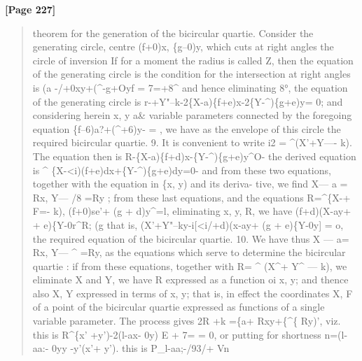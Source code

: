 \documentclass[11pt,a4paper]{book}
\begin{document}
\textbf{[Page 227]}\\[0.2cm]
\begin{quote}
theorem for the generation of the bicircular quartie. Consider the generating circle,
centre (f+0)x, \{g--0)y, which cuts at right angles the circle of inversion
If for a moment the radius is called Z, then the equation of the generating circle is
the condition for the intersection at right angles is
(a -/+0xy+(\textasciicircum{}-g+Oyf = 7=+8\textasciicircum{}
and hence eliminating 8°, the equation of the generating circle is
r-+Y"--k-2\{X-a)\{f+e)x-2\{Y-\textasciicircum{})\{g+e)y=
0;
and considering herein x, y a\& variable parameters connected by the foregoing equation
\{f--6)a?+(\textasciicircum{}+6)y- = , we have as the envelope of this circle the required bicircular
quartie.
9. It is convenient to write i2 = \textasciicircum{}(X'+Y---- k). The equation then is
R-\{X-a)\{f+d)x-\{Y-\textasciicircum{})\{g+e)y\textasciicircum{}O-
the derived equation is \textasciicircum{}
\{X-<i)(f+e)dx+\{Y-\textasciicircum{})\{g+e)dy=0-
and from these two equations, together with the equation in \{x, y) and its deriva-
tive, we find X--- a = Rx, Y--- /8 =Ry ; from these last equations, and the equations
R=\textasciicircum{}\{X-+ F=- k), (f+0)se'+ (g + d)y\textasciicircum{}=l, eliminating x, y, R, we have
(f+d)(X-ay+ + e)\{Y-0r\textasciicircum{}R;
(g
that is,
(X'+Y"--ky-i[<i/+d)(x-ay+ (g + e)\{Y-0y] = o,
the required equation of the bicircular quartie.
10. We have thus X --- a= Rx, Y--- \textasciicircum{} =Ry, as the equations which serve to
determine the bicircular quartie : if from these equations, together with R= \textasciicircum{} (X\textasciicircum{}+ Y\textasciicircum{} --- k),
we eliminate X and Y, we have R expressed as a function oi x, y; and thence also
X, Y expressed in terms of x, y; that is, in effect the coordinates X, F of a point
of the bicircular quartie expressed as functions of a single variable parameter. The
process gives 2R +k =\{a+ Rxy+\{\textasciicircum{}\{ Ry)', viz. this is
R\textasciicircum{}\{x' +y')-2(l-ax- 0y) E + 7= = 0,
or putting for shortness
n=(l-aa:- 0yy -y'(x'+ y').
this is 
P\_l-aa;-/93/+ Vn
\end{quote}
\end{document}
